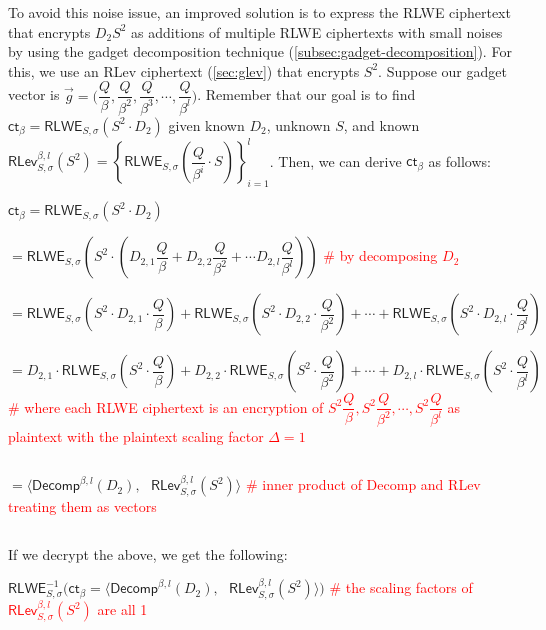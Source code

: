 To avoid this noise issue, an improved solution is to express the RLWE ciphertext that encrypts $D_2 S^2$ as additions of multiple RLWE ciphertexts with small noises by using the gadget decomposition technique (\autoref{subsec:gadget-decomposition}). For this, we use an RLev ciphertext (\autoref{sec:glev}) that encrypts $S^2$. Suppose our gadget vector is $\vec{g} = \Bigg(\dfrac{Q}{\beta}, \dfrac{Q}{\beta^2}, \dfrac{Q}{\beta^3}, \cdots, \dfrac{Q}{\beta^l}\Bigg)$. Remember that our goal is to find $\textsf{ct}_\beta = \textsf{RLWE}_{S, \sigma}( S^2 \cdot D_2)$ given known $D_2$, unknown $S$, and known $\textsf{RLev}_{S, \sigma}^{\beta, l}(S^2) = \left\{\textsf{RLWE}_{S, \sigma}\left(\dfrac{Q}{\beta^i}\cdot S\right)\right\}_{i=1}^{l}$. Then, we can derive $\textsf{ct}_\beta$ as follows:

$\textsf{ct}_\beta = \textsf{RLWE}_{S, \sigma}(S^2 \cdot D_2)$

$= \textsf{RLWE}_{S, \sigma}\left( S^2 \cdot \left(D_{2,1}\dfrac{Q}{\beta} + D_{2,2}\dfrac{Q}{\beta^2} + \cdots D_{2,l}\dfrac{Q}{\beta^l}\right)\right)$ \textcolor{red}{\text{ } \# by decomposing $D_2$}

$= \textsf{RLWE}_{S, \sigma}\left( S^2 \cdot D_{2,1} \cdot \dfrac{Q}{\beta}\right) + \textsf{RLWE}_{S, \sigma}\left( S^2 \cdot D_{2,2} \cdot \dfrac{Q}{\beta^2}\right) + \cdots + \textsf{RLWE}_{S, \sigma}\left( S^2 \cdot D_{2,l} \cdot \dfrac{Q}{\beta^l}\right)$ 

$= D_{2,1}\cdot\textsf{RLWE}_{S, \sigma}\left( S^2 \cdot \dfrac{Q}{\beta}\right) + D_{2,2}\cdot\textsf{RLWE}_{S, \sigma}\left( S^2 \cdot \dfrac{Q}{\beta^2}\right) + \cdots + D_{2,l}\cdot\textsf{RLWE}_{S, \sigma}\left( S^2 \cdot \dfrac{Q}{\beta^l}\right)$ 
\textcolor{red}{ \# where each \textsf{RLWE} ciphertext is an encryption of $S^2\dfrac{Q}{\beta}, S^2\dfrac{Q}{\beta^2}, \cdots, S^2\dfrac{Q}{\beta^l}$ as plaintext with the plaintext scaling factor $\Delta = 1$}

$ $

$= \bm{\langle} \textsf{Decomp}^{\beta, l}(D_2), \text{ } \textsf{RLev}_{S, \sigma}^{\beta, l}( S^2) \bm{\rangle}$ \textcolor{red}{\text{ } \# inner product of \textsf{Decomp} and \textsf{RLev} treating them as vectors}

$ $

If we decrypt the above, we get the following:

$\textsf{RLWE}_{S, \sigma}^{-1}(\textsf{ct}_\beta = \bm{\langle} \textsf{Decomp}^{\beta, l}(D_2), \text{ } \textsf{RLev}_{S, \sigma}^{\beta, l}( S^2) \bm{\rangle} \bm{)}$ \textcolor{red}{ \# the scaling factors of $\textsf{RLev}_{S, \sigma}^{\beta, l}( S^2)$ are all 1}

